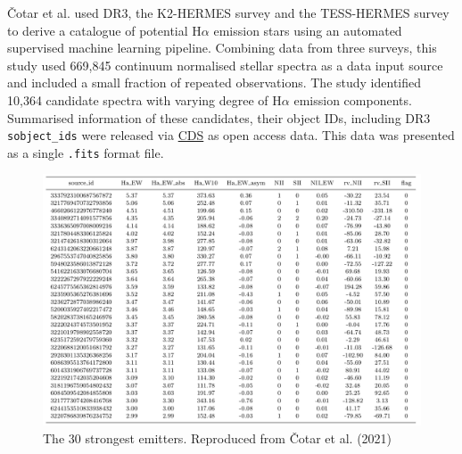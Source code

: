 Čotar et al. used DR3\cite{de2015galah}, the K2-HERMES survey\cite{wittenmyer2018k2} and the TESS-HERMES survey\cite{sharma2018tess} to derive a catalogue of potential H$\alpha$ emission stars using an automated supervised machine learning pipeline. Combining data from three surveys, this study used 669,845 continuum normalised stellar spectra as a data input source and included a small fraction of repeated observations. The study identified 10,364 candidate spectra with varying degree of H$\alpha$ emission components. Summarised information of these candidates, their object IDs, including DR3 \texttt{sobject\_ids} were released via \href{https://cdsweb.u-strasbg.fr/}{CDS} as open access data. This data was presented as a single \texttt{.fits} format file.

\begin{figure}[t]
\centering
\includegraphics[scale=.40]{figures/cotartable.png}
\caption{The 30 strongest emitters. Reproduced from Čotar et al. (2021)\cite{vcotar2021galah}}
\end{figure}
